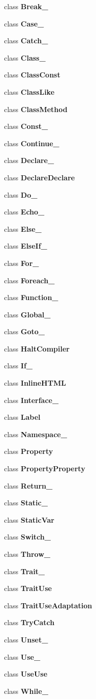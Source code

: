 \begin{DoxyCompactItemize}
\item 
class {\bf Break\+\_\+}
\item 
class {\bf Case\+\_\+}
\item 
class {\bf Catch\+\_\+}
\item 
class {\bf Class\+\_\+}
\item 
class {\bf Class\+Const}
\item 
class {\bf Class\+Like}
\item 
class {\bf Class\+Method}
\item 
class {\bf Const\+\_\+}
\item 
class {\bf Continue\+\_\+}
\item 
class {\bf Declare\+\_\+}
\item 
class {\bf Declare\+Declare}
\item 
class {\bf Do\+\_\+}
\item 
class {\bf Echo\+\_\+}
\item 
class {\bf Else\+\_\+}
\item 
class {\bf Else\+If\+\_\+}
\item 
class {\bf For\+\_\+}
\item 
class {\bf Foreach\+\_\+}
\item 
class {\bf Function\+\_\+}
\item 
class {\bf Global\+\_\+}
\item 
class {\bf Goto\+\_\+}
\item 
class {\bf Halt\+Compiler}
\item 
class {\bf If\+\_\+}
\item 
class {\bf Inline\+H\+T\+M\+L}
\item 
class {\bf Interface\+\_\+}
\item 
class {\bf Label}
\item 
class {\bf Namespace\+\_\+}
\item 
class {\bf Property}
\item 
class {\bf Property\+Property}
\item 
class {\bf Return\+\_\+}
\item 
class {\bf Static\+\_\+}
\item 
class {\bf Static\+Var}
\item 
class {\bf Switch\+\_\+}
\item 
class {\bf Throw\+\_\+}
\item 
class {\bf Trait\+\_\+}
\item 
class {\bf Trait\+Use}
\item 
class {\bf Trait\+Use\+Adaptation}
\item 
class {\bf Try\+Catch}
\item 
class {\bf Unset\+\_\+}
\item 
class {\bf Use\+\_\+}
\item 
class {\bf Use\+Use}
\item 
class {\bf While\+\_\+}
\end{DoxyCompactItemize}
